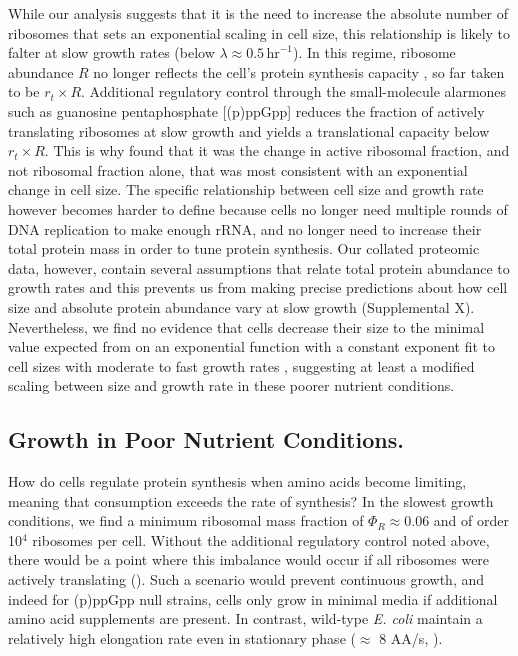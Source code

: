 While our analysis suggests that it is the need to increase the absolute number
of ribosomes that sets an exponential scaling in cell size, this relationship is
likely to falter at slow growth rates (below $\lambda \approx
0.5\,\text{hr}^{-1}$). In this regime, ribosome abundance $R$ no longer reflects
the cell's protein synthesis capacity \citep{dai2016}, so far taken to be $r_t
\times R$. Additional regulatory control through the small-molecule alarmones such as
guanosine pentaphosphate [(p)ppGpp] reduces the fraction of actively translating
ribosomes at slow growth and yields a translational capacity below $r_t\times R$. This
is why \cite{si2017} found that it was the change in active ribosomal fraction,
and not ribosomal fraction alone, that was most consistent with an exponential
change in cell size. The specific relationship between cell size and growth rate
however becomes harder to define because cells no longer need multiple rounds of
DNA replication to make enough rRNA, and no longer need to increase their total
protein mass in order to tune protein synthesis. Our collated proteomic data,
however, contain several assumptions that relate total protein abundance to
growth rates and this prevents us from making precise predictions about how cell
size and absolute protein abundance vary at slow growth (Supplemental X).
Nevertheless, we find no evidence that cells decrease their size to the minimal
value expected from on an exponential function with a constant exponent fit to
cell sizes with moderate to fast growth rates \citep{basan2015, radzikowski2016,
si2019}, suggesting at least a modified scaling between size and growth rate in
these poorer nutrient conditions.

\subsection{Growth in Poor Nutrient Conditions.}

How do cells regulate protein synthesis when amino acids become limiting,
meaning that consumption exceeds the rate of synthesis? In the slowest  growth
conditions, we find a minimum ribosomal mass fraction of $\Phi_R \approx 0.06$
and  of order 10$^4$ ribosomes per cell.   Without the additional regulatory
control noted above, there would be a point where  this imbalance would occur if
all ribosomes were actively translating  (). Such a
scenario would prevent continuous growth, and indeed for (p)ppGpp null strains,
cells only grow in minimal media if additional amino acid supplements are
present. In contrast, wild-type \textit{E. coli} maintain a relatively high
elongation rate even in stationary phase ($\approx$ 8 AA/s, \citep{dai2016,
dai2018}).

